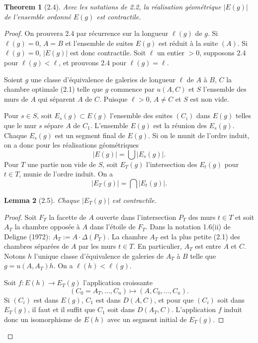 \documentclass[11pt]{article}
\newtheorem{theorem}{Theorem}[section]
\newtheorem{lemma}[theorem]{Lemma}
\begin{document}
\begin{theorem}[2.4]
Avec les notations de 2.2, la réalisation géométrique $|E(g)|$ de l'ensemble ordonné $E(g)$ est contractile.
\end{theorem}
\begin{proof}
On prouvera 2.4 par récurrence sur la longueur $\ell(g)$ de $g$. Si $\ell(g)=0$, $A=B$ et l'ensemble de suites $E(g)$ est réduit à la suite $(A)$. Si $\ell(g)=0$, $|E(g)|$ est donc contractile. Soit $\ell$ un entier $>0$, supposons 2.4 pour $\ell(g)<\ell$, et prouvons 2.4 pour $\ell(g)=\ell$.

Soient $g$ une classe d'équivalence de galeries de longueur $\ell$ de $A$ à $B$, $C$ la chambre optimale (2.1) telle que $g$ commence par $u(A,C)$ et $S$ l'ensemble des murs de $A$ qui séparent $A$ de $C$. Puisque $\ell>0$, $A\ne C$ et $S$ est non vide.

Pour $s\in S$, soit $E_s(g)\subset E(g)$ l'ensemble des suites $(C_i)$ dans $E(g)$ telles que le mur $s$ sépare $A$ de $C_1$. L'ensemble $E(g)$ est la réunion des $E_s(g)$. Chaque $E_s(g)$ est un segment final de $E(g)$. Si on le munit de l'ordre induit, on a donc pour les réalisations géométriques
\begin{equation}
 |E(g)|=\bigcup |E_s(g)|.
\tag{2.4.1}
\end{equation}
Pour $T$ une partie non vide de $S$, soit $E_T(g)$ l'intersection des $E_t(g)$ pour $t\in T$, munie de l'ordre induit. On a
\begin{equation}
 |E_T(g)|=\bigcap |E_t(g)|.
\tag{2.4.2}
\end{equation}

\begin{lemma}[2.5]
Chaque $|E_T(g)|$ est contractile.
\end{lemma}
\begin{proof}
Soit $F_T$ la facette de $A$ ouverte dans l'intersection $P_T$ des murs $t\in T$ et soit $A_T$ la chambre opposée à $A$ dans l'étoile de $F_T$. Dans la notation 1.6(ii) de Deligne (1972): $A_T:=A\cdot\Delta(P_T)$. La chambre $A_T$ est la plus petite (2.1) des chambres séparées de $A$ par les murs $t\in T$. En particulier, $A_T$ est entre $A$ et $C$. Notons $h$ l'unique classe d'équivalence de galeries de $A_T$ à $B$ telle que $g=u(A,A_T)h$. On a $\ell(h)<\ell(g)$.

Soit $f:E(h)\to E_T(g)$ l'application croissante
\begin{equation}
 (C_0=A_T,\ldots,C_n)\mapsto(A,C_0,\ldots,C_n).
\tag{2.5.1}
\end{equation}
Si $(C_i)$ est dans $E(g)$, $C_1$ est dans $D(A,C)$, et pour que $(C_i)$ soit dans $E_T(g)$, il faut et il suffit que $C_1$ soit dans $D(A_T,C)$. L'application $f$ induit donc un isomorphisme de $E(h)$ avec un segment initial de $E_T(g)$.


\end{proof}
\end{proof}
\end{document}
